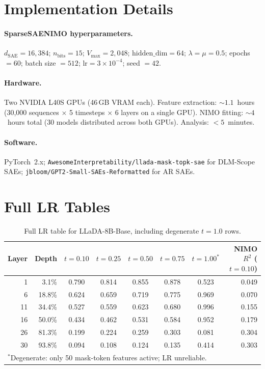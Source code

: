 \documentclass[11pt]{article}
\begin{document}



\appendix

\section{Implementation Details}
\label{app:impl}

\paragraph{SparseSAENIMO hyperparameters.}
$d_\mathrm{SAE} = 16{,}384$; $n_\mathrm{bits} = 15$; $V_\mathrm{max} = 2{,}048$; $\mathrm{hidden\_dim} = 64$; $\lambda = \mu = 0.5$; epochs $= 60$; batch size $= 512$; $\mathrm{lr} = 3\times10^{-4}$; seed $= 42$.

\paragraph{Hardware.}
Two NVIDIA L40S GPUs (46\,GB VRAM each).
Feature extraction: ${\sim}1.1$~hours (30,000 sequences $\times$ 5 timesteps $\times$ 6 layers on a single GPU).
NIMO fitting: ${\sim}4$~hours total (30 models distributed across both GPUs).
Analysis: ${<}5$~minutes.

\paragraph{Software.}
PyTorch~2.x; \texttt{AwesomeInterpretability/llada-mask-topk-sae} for DLM-Scope SAEs; \texttt{jbloom/GPT2-Small-SAEs-Reformatted} for AR SAEs.

\section{Full LR Tables}
\label{app:full_lr}

\begin{table}[h]
\centering
\caption{Full LR table for LLaDA-8B-Base, including degenerate $t=1.0$ rows.}
\label{tab:full_lr_dlm}
\begin{tabular}{rr ccccc r}
\toprule
\textbf{Layer} & \textbf{Depth} & $t=0.10$ & $t=0.25$ & $t=0.50$ & $t=0.75$ & $t=1.00^*$ & \textbf{NIMO $R^2$ ($t{=}0.10$)} \\
\midrule
1  & 3.1\%  & 0.790 & 0.814 & 0.855 & 0.878 & 0.523 & 0.049 \\
6  & 18.8\% & 0.624 & 0.659 & 0.719 & 0.775 & 0.969 & 0.070 \\
11 & 34.4\% & 0.527 & 0.559 & 0.623 & 0.680 & 0.996 & 0.155 \\
16 & 50.0\% & 0.434 & 0.462 & 0.531 & 0.584 & 0.952 & 0.179 \\
26 & 81.3\% & 0.199 & 0.224 & 0.259 & 0.303 & 0.081 & 0.304 \\
30 & 93.8\% & 0.094 & 0.108 & 0.124 & 0.135 & 0.414 & 0.303 \\
\bottomrule
\multicolumn{8}{l}{$^*$Degenerate: only 50 mask-token features active; LR unreliable.}
\end{tabular}
\end{table}
\end{document}
